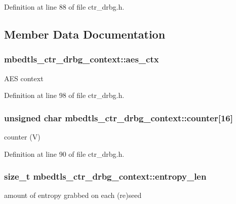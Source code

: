 Definition at line 88 of file ctr\-\_\-drbg.\-h.



\subsection{Member Data Documentation}
\hypertarget{structmbedtls__ctr__drbg__context_ab9513701b8389770eb294cbc4267ff92}{
\subsubsection[{aes\-\_\-ctx}]{ mbedtls\-\_\-ctr\-\_\-drbg\-\_\-context\-::aes\-\_\-ctx}}\label{structmbedtls__ctr__drbg__context_ab9513701b8389770eb294cbc4267ff92}
A\-E\-S context 

Definition at line 98 of file ctr\-\_\-drbg.\-h.

\hypertarget{structmbedtls__ctr__drbg__context_a45ccb95b2b7828711c158fc4a06d41fc}{
\subsubsection[{counter}]{\setlength{\rightskip}{0pt plus 5cm}unsigned char mbedtls\-\_\-ctr\-\_\-drbg\-\_\-context\-::counter\mbox{[}16\mbox{]}}}\label{structmbedtls__ctr__drbg__context_a45ccb95b2b7828711c158fc4a06d41fc}
counter (V) 

Definition at line 90 of file ctr\-\_\-drbg.\-h.

\hypertarget{structmbedtls__ctr__drbg__context_aa874779eab1f355824ff692b33755476}{
\subsubsection[{entropy\-\_\-len}]{\setlength{\rightskip}{0pt plus 5cm}size\-\_\-t mbedtls\-\_\-ctr\-\_\-drbg\-\_\-context\-::entropy\-\_\-len}}\label{structmbedtls__ctr__drbg__context_aa874779eab1f355824ff692b33755476}
amount of entropy grabbed on each (re)seed 

